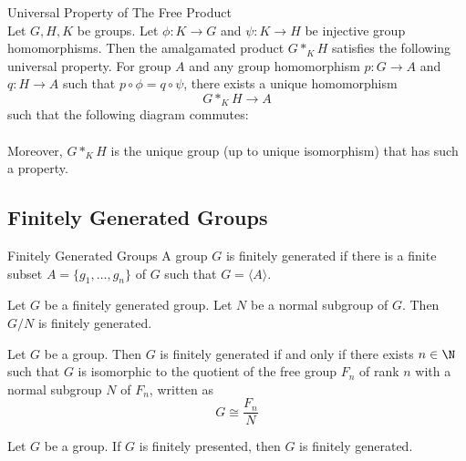 \documentclass[a4paper]{article}
\begin{document}
\begin{prp}{Universal Property of The Free Product}{}\\
Let $G,H,K$ be groups. Let $\phi:K\to G$ and $\psi:K\to H$ be injective group homomorphisms. Then the amalgamated product $G\ast_KH$ satisfies the following universal property. For group $A$ and any group homomorphism $p:G\to A$ and $q:H\to A$ such that $p\circ\phi=q\circ\psi$, there exists a unique homomorphism $$G\ast_KH\to A$$ such that the following diagram commutes: \\
 \\
Moreover, $G\ast_KH$ is the unique group (up to unique isomorphism) that has such a property. 
\end{prp}

\subsection{Finitely Generated Groups}
\begin{defn}{Finitely Generated Groups}{} A group $G$ is finitely generated if there is a finite subset $A=\{g_1,\dots,g_n\}$ of $G$ such that $G=\langle A\rangle$. 
\end{defn}

\begin{prp}{}{} Let $G$ be a finitely generated group. Let $N$ be a normal subgroup of $G$. Then $G/N$ is finitely generated. 
\end{prp}

\begin{prp}{}{} Let $G$ be a group. Then $G$ is finitely generated if and only if there exists $n\in\N$ such that $G$ is isomorphic to the quotient of the free group $F_n$ of rank $n$ with a normal subgroup $N$ of $F_n$, written as $$G\cong\frac{F_n}{N}$$
\end{prp}

\begin{prp}{}{} Let $G$ be a group. If $G$ is finitely presented, then $G$ is finitely generated. 
\end{prp}
\end{document}

